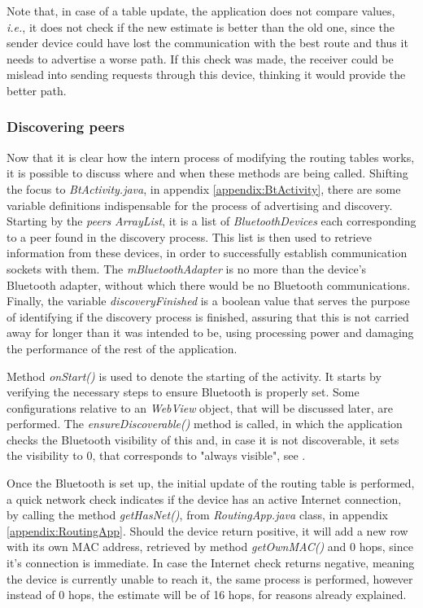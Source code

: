 Note that, in case of a table update, the application does not compare values, \textit{i.e.}, it does not check if the new estimate is better than the old one, since the sender device could have lost the communication with the best route and thus it needs to advertise a worse path. If this check was made, the receiver could be mislead into sending requests through this device, thinking it would provide the better path.

\subsubsection{Discovering peers}
\label{subsubsec:disc}

Now that it is clear how the intern process of modifying the routing tables works, it is possible to discuss where and when these methods are being called. Shifting the focus to \textit{BtActivity.java}, in appendix \ref{appendix:BtActivity}, there are some variable definitions indispensable for the process of advertising and discovery. Starting by the \textit{peers} \textit{ArrayList}, it is a list of \textit{BluetoothDevices} each corresponding to a peer found in the discovery process. This list is then used to retrieve information from these devices, in order to successfully establish communication sockets with them. The \textit{mBluetoothAdapter} is no more than the device's Bluetooth adapter, without which there would be no Bluetooth communications. Finally, the variable \textit{discoveryFinished} is a boolean value that serves the purpose of identifying if the discovery process is finished, assuring that this is not carried away for longer than it was intended to be, using processing power and damaging the performance of the rest of the application.

Method \textit{onStart()} is used to denote the starting of the activity. It  starts by verifying the necessary steps to ensure Bluetooth is properly set. Some configurations relative to an \textit{WebView} object, that will be discussed later, are performed. The \textit{ensureDiscoverable()} method is called, in which the application checks the Bluetooth visibility of this and, in case it is not discoverable, it sets the visibility to 0, that corresponds to "always visible", see \cite{btandroid}.

Once the Bluetooth is set up, the initial update of the routing table is performed, a quick network check indicates if the device has an active Internet connection, by calling the method \textit{getHasNet()}, from \textit{RoutingApp.java} class, in appendix \ref{appendix:RoutingApp}. Should the device return positive, it will add a new row with its own \gls{MAC} address, retrieved by method \textit{getOwnMAC()} and 0 hops, since it's connection is immediate. In case the Internet check returns negative, meaning the device is currently unable to reach it, the same process is performed, however instead of 0 hops, the estimate will be of 16 hops, for reasons already explained.

